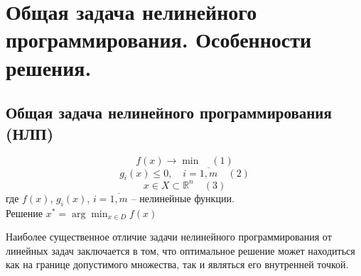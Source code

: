 \documentclass[17pt]{extarticle}
\begin{document}
\section{Общая задача нелинейного \\ программирования. Особенности решения.}
\subsection{Общая задача нелинейного программирования (НЛП)}
\[
    f(x) \rightarrow \min \quad (1)
\]
\[
    g_i(x) \leq 0, \quad i = \overline{1, m} \quad (2)
\]
\[
    x \in X \subset \mathbb{R}^n \quad (3)
\]
где \( f(x) \), \( g_i(x) \), \( i = \overline{1, m} \) -- нелинейные функции. \\
Решение \(x^* = \arg \min_{x \in D} f(x)\)

Наиболее существенное отличие задачи
нелинейного программирования от линейных задач
заключается в том, что оптимальное решение может
находиться как на границе допустимого множества,
так и являться его внутренней точкой.
\end{document}
